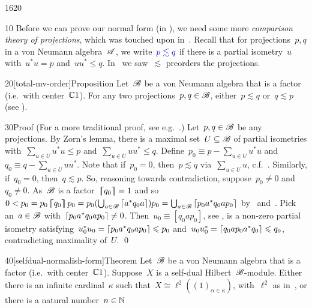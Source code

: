 \begin{parsec}{1620}%
\begin{point}{10}%
Before we can prove our normal form (in ),
    we need some more \emph{comparison theory of projections},
    which was touched upon in~.
Recall that for projections~$p,q$ in a von Neumann algebra~$\mathscr{A}$,
    we write~$\Define{p \lesssim q}$ if there is a partial isometry~$u$
    with~$u^*u=p$ and~$uu^* \leq q$.
In~ we saw~$\lesssim$ preorders the projections.
\end{point}
\begin{point}{20}[total-mv-order]{Proposition}%
Let~$\mathscr{B}$ be a von Neumann algebra that is a factor (i.e.~with center~$\mathbb{C} 1$).
For any two projections~$p,q \in \mathscr{B}$,
    either~$p \lesssim q$ or~$q \lesssim p$ (see ).
\begin{point}{30}{Proof}%
(For a more traditional proof, see e.g.~\cite[Prop.~6.2.4]{kr}.)
Let~$p,q \in \mathscr{B}$ be any projections.
By Zorn's lemma, there is a maximal
    set~$U\subseteq \mathscr{B}$ of partial isometries
    with~$\sum_{u\in U} u^*u \leq p$
    and~$\sum_{u\in U} uu^* \leq q$.
Define~$p_0 \equiv p - \sum_{u\in U} u^*u$
    and~$q_0 \equiv q - \sum_{u \in U} uu^*$.
Note that if~$p_0 = 0$, then~$p \lesssim q$
    via~$\sum_{u \in U} u$, c.f.~.
Similarly, if~$q_0 = 0$, then~$q \lesssim p$.
So, reasoning towards contradiction,
    suppose~$p_0 \neq 0$ and~$q_0 \neq 0$.
As~$\mathscr{B}$ is a factor~$\left\lceil\!\!\left\lceil q_0\right\rceil\!\!\right\rceil = 1$
    and so~$0 < p_0 = p_0\left\lceil\!\!\left\lceil q_0\right\rceil\!\!\right\rceil p_0 = p_0 (\bigcup_{a \in \mathscr{B}} \left\lceil a^* q_0 a \right\rceil) p_0
                = \bigcup_{a \in \mathscr{B}} \left\lceil p_0a^*q_0ap_0\right\rceil$
            by~ and~.
Pick an~$a \in \mathscr{B}$ with~$\left\lceil p_0a^*q_0ap_0\right\rceil \neq 0$.
Then~$u_0 \equiv [q_0ap_0]$, see ,
    is a non-zero partial isometry
    satisfying~$u_0^*u_0 = \left\lceil p_0a^*q_0ap_0\right\rceil \leqslant p_0$
    and~$u_0 u_0^* = \left\lceil q_0ap_0a^*q_0\right\rceil \leqslant q_0$,
    contradicting maximality of~$U$. \qed
\end{point}
\end{point}
\begin{point}{40}[selfdual-normalish-form]{Theorem}%
Let~$\mathscr{B}$ be a von Neumann algebra that is a factor (i.e.~with center~$\mathbb{C} 1$).
Suppose~$X$ is a self-dual Hilbert~$\mathscr{B}$-module.
Either there is an infinite cardinal~$\kappa$
    such that~$X \cong \ell^2((1)_{\alpha \in \kappa})$,
    with~$\ell^2$ as in~,
    or there is a natural number~$n\in \mathbb{N}$

\end{point}
\end{parsec}

